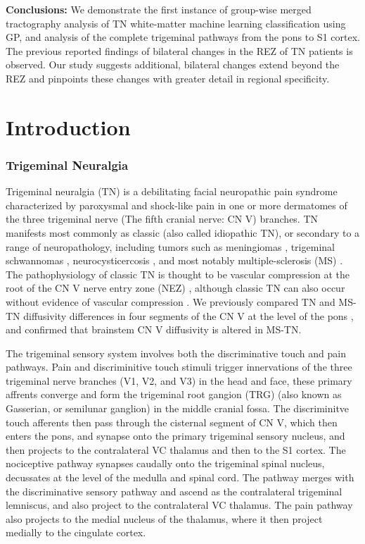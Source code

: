 \textbf{Conclusions:} We  demonstrate the first instance of group-wise merged tractography analysis of TN white-matter machine learning classification using GP, and analysis of the complete trigeminal pathways from the pons to S1 cortex. The previous reported findings of bilateral changes in the REZ of TN patients is observed. Our study suggests additional, bilateral changes extend beyond the REZ and pinpoints these changes with greater detail in regional specificity.

\section{Introduction}
\subsubsection{Trigeminal Neuralgia}
Trigeminal neuralgia (TN) is a debilitating facial neuropathic pain syndrome characterized by paroxysmal and shock-like pain in one or more dermatomes of the three trigeminal nerve (The fifth cranial nerve: CN V) branches. TN manifests most commonly as classic (also called idiopathic TN), or secondary to a range of neuropathology, including tumors such as meningiomas \cite{Cheng2008}, trigeminal schwannomas \cite{Miller2008}, neurocysticercosis \cite{Revuelta1995}, and most notably multiple-sclerosis (MS) \cite{Cruccu2009,VanderMeijs2002,Nick2012}. The pathophysiology of classic TN is thought to be vascular compression at the root of the CN V nerve entry zone (NEZ) \cite{Linn2011,Love2001}, although classic TN can also occur without evidence of vascular compression \cite{Lee2014}. We previously compared TN and MS-TN diffusivity differences in four segments of the CN V at the level of the pons \cite{Chen2016a}, and confirmed that brainstem CN V diffusivity is altered in MS-TN. 

The trigeminal sensory system involves both the discriminative touch and pain pathways.  Pain and discriminitive touch stimuli trigger innervations of the three trigeminal nerve branches (V1, V2, and V3) in the head and face, these primary affrents converge and form the trigeminal root gangion (TRG) (also known as Gasserian, or semilunar ganglion) in the middle cranial fossa. The discriminitve touch afferents then pass through the cisternal segment of CN V, which then enters the pons, and synapse onto the primary trigeminal sensory nucleus, and then projects to the contralateral VC thalamus and then to the S1 cortex. The nociceptive pathway synapses caudally onto the trigeminal spinal nucleus, decussates at the level of the medulla and spinal cord. The pathway merges with the discriminative sensory pathway and ascend as the contralateral trigeminal lemniscus, and also project to the contralateral VC thalamus. The pain pathway also projects to the medial nucleus of the thalamus, where it then project medially to the cingulate cortex. 

